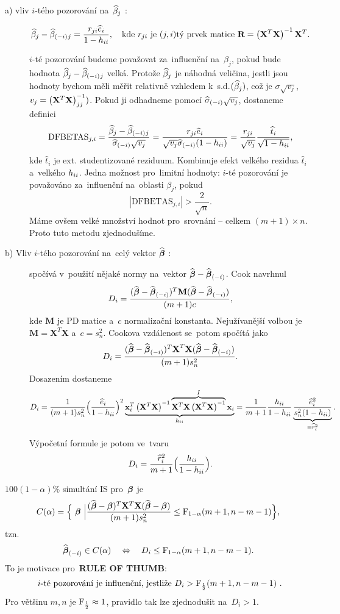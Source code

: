 \begin{description}
	\item[a) vliv $i$-tého pozorování na~$\widehat{\beta}_j$ :]
	 $$ \widehat{\beta}_j-\widehat{\beta}_{(-i)}{}_j = \frac{r_{ji}\widehat{e}_i}{1-h_{ii}},\quad\text{kde } r_{ji} \text{ je }(j,i)\text{tý prvek matice }\textbf{R} = \left(\mathbf{X}^T \mathbf{X} \right)^{-1} \mathbf{X}^T. $$
	
	 $i$-té pozorování budeme považovat za~influenční na~$\beta_j$, pokud bude hodnota $\widehat{\beta}_j-\widehat{\beta}_{(-i)}{}_j$ velká. Protože $\widehat{\beta}_j$ je náhodná veličina, jestli jsou hodnoty  bychom měli měřit relativně vzhledem k~s.d.$(\widehat{\beta}_j)$, což je $\sigma\sqrt{v_j}$, $v_j = \left(\mathbf{X}^T \mathbf{X} \right)^{-1} _{jj})$. Pokud ji odhadneme pomocí $\widehat{{\sigma}}_{(-i)}\sqrt{v_j}$, dostaneme definici
	 $$ \mathrm{DFBETAS}_{j,i} = \frac{\widehat{\beta}_j-\widehat{\beta}_{(-i)}{}_j}{\widehat{{\sigma}}_{(-i)}\sqrt{v_j}} = \frac{r_{ji}\widehat{e}_i}{\sqrt{v_j}\widehat{{\sigma}}_{(-i)}(1-h_{ii})} = \frac{r_{ji}}{\sqrt{v_j}}\frac{\widehat{t}_i}{\sqrt{1-h_{ii}}}, $$
	kde $\widehat{t}_i$ je ext. studentizované reziduum. Kombinuje efekt velkého rezidua $\widehat{t}_i$ a~velkého $h_{ii}$. Jedna možnost pro~limitní hodnoty: $i$-té pozorování je považováno za~influenční na~oblasti $\beta_j$, pokud
	 $$ |\mathrm{DFBETAS}_{j,i}|>\frac{2}{\sqrt{n}}. $$ Máme ovšem velké množství hodnot pro~srovnání -- celkem $(m+1)\times n$. Proto tuto metodu zjednodušíme.

	\item[b) Vliv $i$-tého pozorování na~celý vektor $\widehat{\boldsymbol{\beta}}$ :]
	spočívá v~použití nějaké normy na~vektor \linebreak $\widehat{\boldsymbol{\beta}}-\widehat{\boldsymbol{\beta}}_{(-i)}$. Cook navrhnul
	 $$ D_i = \frac{(\widehat{\boldsymbol{\beta}}-\widehat{\boldsymbol{\beta}}_{(-i)})^T\textbf{M}(\widehat{\boldsymbol{\beta}}-\widehat{\boldsymbol{\beta}}_{(-i)})}{(m+1)c}, $$
	kde $\textbf{M}$ je PD matice a~$c$ normalizační konstanta. Nejužívanější volbou je $\textbf{M} = \textbf{X}^T\textbf{X}$ a~$c = s_n^2$. Cookova vzdálenost se~potom spočítá jako
	 $$ D_i = \frac{(\widehat{\boldsymbol{\beta}}-\widehat{\boldsymbol{\beta}}_{(-i)})^T\textbf{X}^T\textbf{X}(\widehat{\boldsymbol{\beta}}-\widehat{\boldsymbol{\beta}}_{(-i)})}{(m+1)s_n^2}. $$
	Dosazením dostaneme
	 $$ D_i = \frac{1}{(m+1)s_n^2}\Big(\frac{\widehat{e}_i}{1-h_{ii}}\Big)^2 \underbrace{\mathbf{x}_i^T\left(\mathbf{X}^T \mathbf{X} \right)^{-1}  \overbrace{\mathbf{X}^T\mathbf{X}\left(\mathbf{X}^T \mathbf{X} \right)^{-1} }^I\mathbf{x}_i}_{h_{ii}} = \frac{1}{m+1}\frac{h_{ii}}{1-h_{ii}}\underbrace{\frac{\widehat{e}_i^2}{s_n^2(1-h_{ii})}}_{=\widehat{r}_i^2}. $$
	Výpočetní formule je potom ve~tvaru
	 $$ D_i = \frac{\widehat{r}_i^2}{m+1}\Big(\frac{h_{ii}}{1-h_{ii}}\Big). $$
\end{description}

\begin{remark}
	 $100(1-\alpha)\%$ simultání IS pro~$\boldsymbol{\beta}$ je $$ C(\alpha) = \Big\{ ~\boldsymbol{\beta}~\Big|\frac{(\widehat{\boldsymbol{\beta}}-\boldsymbol{\beta})^T\mathbf{X}^T\mathbf{X}(\widehat{\boldsymbol{\beta}}-\boldsymbol{\beta})}{(m+1)s_n^2}\leq \mathrm{F}_{1-\alpha}(m+1,n-m-1) \Big\}, $$
	tzn. $$ \widehat{\boldsymbol{\beta}}_{(-i)}\in C(\alpha)\quad \Leftrightarrow\quad D_i\leq \mathrm{F}_{1-\alpha}(m+1,n-m-1). $$
	To je motivace pro~\textbf{RULE OF THUMB}: $$ \text{ $i$-té pozorování je influenční, jestliže $D_i>\mathrm{F}_{\frac{1}{2}}(m+1,n-m-1)$ }.$$
	Pro většinu $m,n$ je $\mathrm{F}_{\frac{1}{2}}\approx1$, pravidlo tak lze zjednodušit na~$D_i>1$.
\end{remark}

